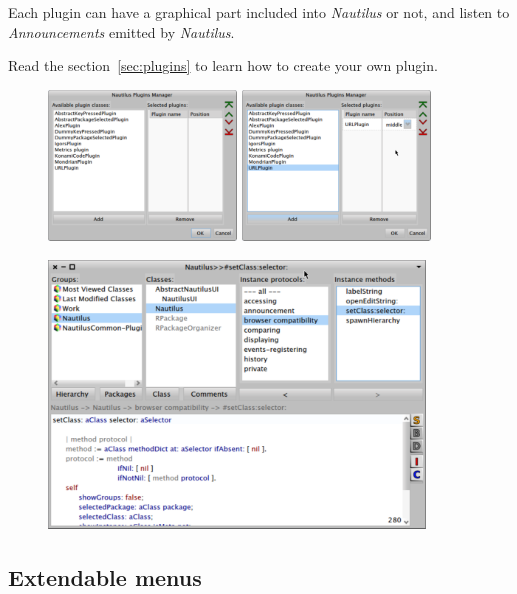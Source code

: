 \documentclass[a4paper,10pt,twoside]{book}
\newcommand\nautilus{\emph{Nautilus}\xspace}
\begin{document}
Each plugin can have a graphical part included into \nautilus or not, and listen to \emph{Announcements} emitted by \nautilus.

Read the section~\ref{sec:plugins} to learn how to create your own plugin.

\begin{figure}[ht]
\begin{center}
	\includegraphics[width=5cm]{figures/plugin1}
	\label{fig:plugin1}
	\includegraphics[width=5cm]{figures/plugin2}
	\label{fig:plugin2}
\end{center}
\begin{center}
	\includegraphics[width=10cm]{figures/plugin3}
	\label{fig:plugin3}
\end{center}
\end{figure}
\newpage

\subsection*{Extendable menus}
\end{document}
